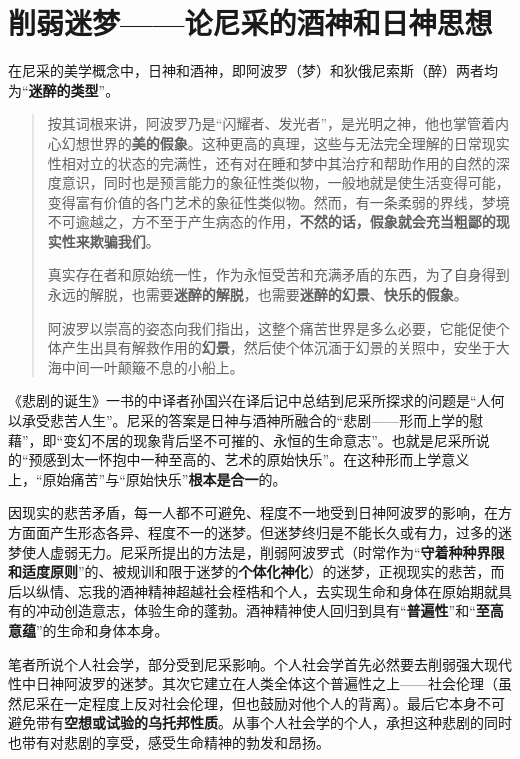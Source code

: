 \chapter{削弱迷梦------论尼采的酒神和日神思想}
\label{chap:nicai}

在尼采的美学概念中，日神和酒神，即阿波罗（梦）和狄俄尼索斯（醉）两者均为“\textbf{迷醉的类型}”\cite[125]{ouxianghuanghun}。

\begin{quotation}按其词根来讲，阿波罗乃是“闪耀者、发光者”，是光明之神，他也掌管着内心幻想世界的\textbf{美的假象}。这种更高的真理，这些与无法完全理解的日常现实性相对立的状态的完满性，还有对在睡和梦中其治疗和帮助作用的自然的深度意识，同时也是预言能力的象征性类似物，一般地就是使生活变得可能，变得富有价值的各门艺术的象征性类似物。然而，有一条柔弱的界线，梦境不可逾越之，方不至于产生病态的作用，\textbf{不然的话，假象就会充当粗鄙的现实性来欺骗我们}。

  真实存在者和原始统一性，作为永恒受苦和充满矛盾的东西，为了自身得到永远的解脱，也需要\textbf{迷醉的解脱}，也需要\textbf{迷醉的幻景}、\textbf{快乐的假象}。

  阿波罗以崇高的姿态向我们指出，这整个痛苦世界是多么必要，它能促使个体产生出具有解救作用的\textbf{幻景}，然后使个体沉湎于幻景的关照中，安坐于大海中间一叶颠簸不息的小船上。\cite{beijudansheng}
\end{quotation}

《悲剧的诞生》一书的中译者孙国兴在译后记中总结到尼采所探求的问题是“人何以承受悲苦人生”。尼采的答案是日神与酒神所融合的“悲剧——形而上学的慰藉”，即“变幻不居的现象背后坚不可摧的、永恒的生命意志”。也就是尼采所说的“预感到太一怀抱中一种至高的、艺术的原始快乐”。在这种形而上学意义上，“原始痛苦”与“原始快乐”\textbf{根本是合一}的。

因现实的悲苦矛盾，每一人都不可避免、程度不一地受到日神阿波罗的影响，在方方面面产生形态各异、程度不一的迷梦。但迷梦终归是不能长久或有力，过多的迷梦使人虚弱无力。尼采所提出的方法是，削弱阿波罗式（时常作为“\textbf{守着种种界限和适度原则}”的、被规训和限于迷梦的\textbf{个体化神化}）的迷梦，正视现实的悲苦，而后以纵情、忘我的酒神精神超越社会桎梏和个人，去实现生命和身体在原始期就具有的冲动创造意志，体验生命的蓬勃。酒神精神使人回归到具有“\textbf{普遍性}”和“\textbf{至高意蕴}”的生命和身体本身。

笔者所说个人社会学，部分受到尼采影响。个人社会学首先必然要去削弱强大现代性中日神阿波罗的迷梦。其次它建立在人类全体这个普遍性之上——社会伦理（虽然尼采在一定程度上反对社会伦理，但也鼓励对他个人的背离）。最后它本身不可避免带有\textbf{空想或试验的乌托邦性质}。从事个人社会学的个人，承担这种悲剧的同时也带有对悲剧的享受，感受生命精神的勃发和昂扬。
